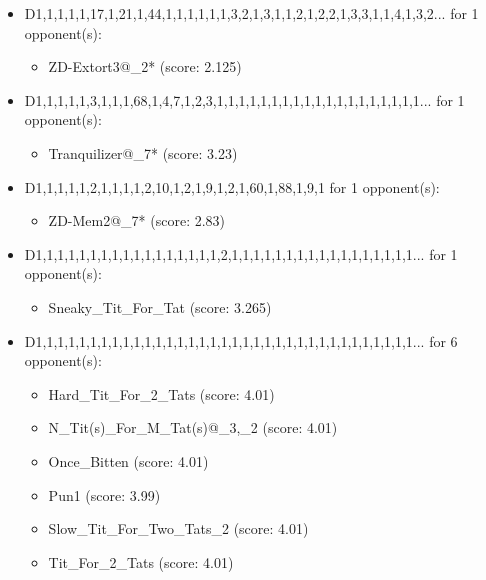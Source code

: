 \begin{appendices}
\begin{itemize}
    \item D1,1,1,1,1,17,1,21,1,44,1,1,1,1,1,1,3,2,1,3,1,1,2,1,2,2,1,3,3,1,1,4,1,3,2... for 1 opponent(s):
    \begin{multicols}{3}
         \begin{itemize}
            \item ZD-Extort3@\_2* (score: 2.125)
        \end{itemize}
     \end{multicols}
     
    \item D1,1,1,1,1,3,1,1,1,68,1,4,7,1,2,3,1,1,1,1,1,1,1,1,1,1,1,1,1,1,1,1,1,1,1... for 1 opponent(s):
    \begin{multicols}{3}
         \begin{itemize}
            \item Tranquilizer@\_7* (score: 3.23)
        \end{itemize}
     \end{multicols}
     
    \item D1,1,1,1,1,2,1,1,1,1,2,10,1,2,1,9,1,2,1,60,1,88,1,9,1 for 1 opponent(s):
    \begin{multicols}{3}
         \begin{itemize}
            \item ZD-Mem2@\_7* (score: 2.83)
        \end{itemize}
     \end{multicols}
     
    \item D1,1,1,1,1,1,1,1,1,1,1,1,1,1,1,1,1,2,1,1,1,1,1,1,1,1,1,1,1,1,1,1,1,1,1... for 1 opponent(s):
    \begin{multicols}{3}
         \begin{itemize}
            \item Sneaky\_Tit\_For\_Tat (score: 3.265)
        \end{itemize}
     \end{multicols}
     
    \item D1,1,1,1,1,1,1,1,1,1,1,1,1,1,1,1,1,1,1,1,1,1,1,1,1,1,1,1,1,1,1,1,1,1,1... for 6 opponent(s):
    \begin{multicols}{3}
         \begin{itemize}
            \item Hard\_Tit\_For\_2\_Tats (score: 4.01)
            \item N\_Tit(s)\_For\_M\_Tat(s)@\_3,\_2 (score: 4.01)
            \item Once\_Bitten (score: 4.01)
            \item Pun1 (score: 3.99)
            \item Slow\_Tit\_For\_Two\_Tats\_2 (score: 4.01)
            \item Tit\_For\_2\_Tats (score: 4.01)
        \end{itemize}
     \end{multicols}
     

\end{itemize}
\end{appendices}
